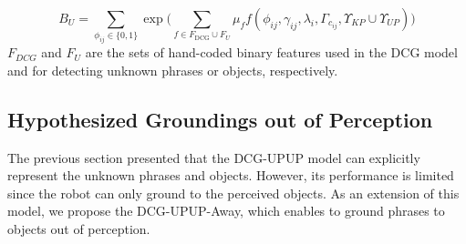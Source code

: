 \begin{equation}
B_U= \sum_{\phi_{ij} \in \{0,1\}}\exp \Big( \sum_{f \in F_{\text{DCG}} \cup F_U} \mu_f f(\phi_{ij},\gamma_{ij},\lambda_i,\Gamma_{c_{ij}},\Upsilon_{KP} \cup \Upsilon_{UP}) \Big) \nonumber
\end{equation}
$F_{DCG}$ and $F_{U}$ are the sets of hand-coded binary features used in the DCG model and for detecting unknown phrases or objects, respectively.
%

\subsection{Hypothesized Groundings out of Perception}
The previous section presented that the DCG-UPUP model can explicitly represent the unknown phrases and objects. However, its performance is limited since the robot can only ground to the perceived objects. As an extension of this model, we propose the DCG-UPUP-Away, which enables to ground phrases to objects out of perception.

